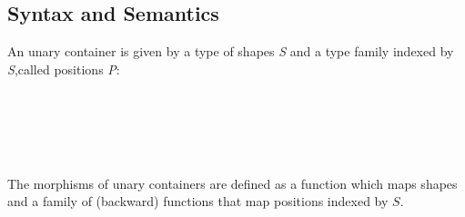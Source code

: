 {\subsection{Syntax and Semantics}

An unary container is given by a type of shapes \textit{S} and a type family indexed by \textit{S},called positions \textit{P}:

\begin{code}%
\>[0]\AgdaSpace{}%
\AgdaSpace{}%
\AgdaSymbol{:}\AgdaSpace{}%
\AgdaSpace{}%
\<%
\\
\>[0][@{}l@{\AgdaIndent{0}}]%
\>[2]\AgdaSpace{}%
\<%
\\
%
\>[2]\<%
\\
\>[2][@{}l@{\AgdaIndent{0}}]%
\>[4]\AgdaSpace{}%
\AgdaSymbol{:}\AgdaSpace{}%
\<%
\\
%
\>[4]\AgdaSpace{}%
\AgdaSymbol{:}\AgdaSpace{}%
\AgdaSpace{}%
\AgdaSpace{}%
\<%
\end{code}

\begin{code}[hide]%
\>[0]\AgdaSpace{}%
\AgdaSpace{}%
\AgdaSpace{}%
\AgdaSpace{}%
\AgdaSpace{}%
\AgdaSpace{}%
\AgdaSymbol{:}\AgdaSpace{}%
\<%
\end{code}

The morphisms of unary containers are defined as a function which maps shapes and a family of (backward) functions that map positions indexed by $S$.

}
